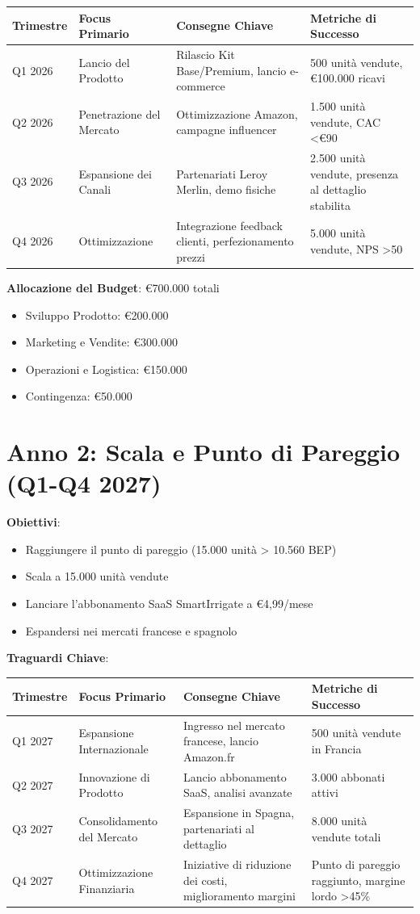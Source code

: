 \documentclass[11pt,a4paper]{report}
\begin{document}
\begin{longtable}{|p{2cm}|p{3cm}|p{3cm}|p{3cm}|}
\hline
\textbf{Trimestre} & \textbf{Focus Primario} & \textbf{Consegne Chiave} & \textbf{Metriche di Successo} \\ \hline
Q1 2026 & Lancio del Prodotto & Rilascio Kit Base/Premium, lancio e-commerce & 500 unità vendute, €100.000 ricavi \\ \hline
Q2 2026 & Penetrazione del Mercato & Ottimizzazione Amazon, campagne influencer & 1.500 unità vendute, CAC <€90 \\ \hline
Q3 2026 & Espansione dei Canali & Partenariati Leroy Merlin, demo fisiche & 2.500 unità vendute, presenza al dettaglio stabilita \\ \hline
Q4 2026 & Ottimizzazione & Integrazione feedback clienti, perfezionamento prezzi & 5.000 unità vendute, NPS >50 \\ \hline
\end{longtable}

\textbf{Allocazione del Budget}: €700.000 totali
\begin{itemize}
    \item Sviluppo Prodotto: €200.000
    \item Marketing e Vendite: €300.000
    \item Operazioni e Logistica: €150.000
    \item Contingenza: €50.000
\end{itemize}

\section{Anno 2: Scala e Punto di Pareggio (Q1-Q4 2027)}
\textbf{Obiettivi}:
\begin{itemize}
    \item Raggiungere il punto di pareggio (15.000 unità > 10.560 BEP)
    \item Scala a 15.000 unità vendute
    \item Lanciare l'abbonamento SaaS SmartIrrigate a €4,99/mese
    \item Espandersi nei mercati francese e spagnolo
\end{itemize}

\textbf{Traguardi Chiave}:

\begin{longtable}{|p{2cm}|p{3cm}|p{3cm}|p{3cm}|}
\hline
\textbf{Trimestre} & \textbf{Focus Primario} & \textbf{Consegne Chiave} & \textbf{Metriche di Successo} \\ \hline
Q1 2027 & Espansione Internazionale & Ingresso nel mercato francese, lancio Amazon.fr & 500 unità vendute in Francia \\ \hline
Q2 2027 & Innovazione di Prodotto & Lancio abbonamento SaaS, analisi avanzate & 3.000 abbonati attivi \\ \hline
Q3 2027 & Consolidamento del Mercato & Espansione in Spagna, partenariati al dettaglio & 8.000 unità vendute totali \\ \hline
Q4 2027 & Ottimizzazione Finanziaria & Iniziative di riduzione dei costi, miglioramento margini & Punto di pareggio raggiunto, margine lordo >45\% \\ \hline
\end{longtable}
\end{document}
